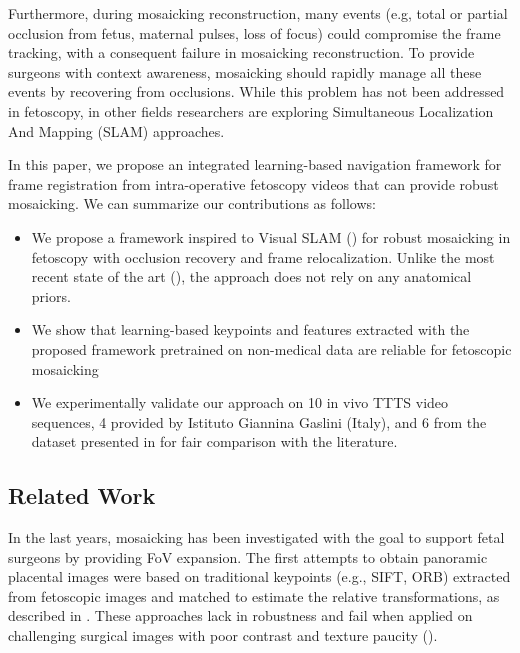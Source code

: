 \documentclass[sn-basic]{sn-jnl}%
\begin{document}
Furthermore, during mosaicking reconstruction, many events (e.g, total or partial occlusion from fetus, maternal pulses, loss of focus) could compromise the frame tracking, with a consequent failure in mosaicking reconstruction.
%
To provide surgeons with context awareness, mosaicking should rapidly manage all these events by recovering from occlusions. 
While this problem has not been addressed in fetoscopy, in other fields researchers are exploring Simultaneous Localization And Mapping (SLAM) approaches.




In this paper, we propose an integrated learning-based navigation framework for frame registration from intra-operative fetoscopy videos that can provide robust mosaicking. %
%
We can summarize our contributions as follows:
\begin{itemize}
    \item We propose a  framework inspired to Visual SLAM (\cite{taketomi2017visual})  for robust mosaicking in fetoscopy with occlusion recovery and frame relocalization. Unlike the most recent state of the art (\cite{BanoMosaicking2020}), the approach does not rely on any anatomical priors. %
    \item We show that learning-based keypoints and features extracted with the proposed framework pretrained on non-medical data are reliable for fetoscopic mosaicking
    \item We experimentally validate our approach on 10 in vivo TTTS video sequences, 4 provided by Istituto Giannina Gaslini (Italy), and 6 from the dataset presented in \cite{BanoMosaicking2020} for fair comparison with the literature.
\end{itemize}


\subsection{Related Work}
\label{sec:related}
In the last years, mosaicking has been investigated with the goal to support fetal surgeons by providing FoV expansion. 
The first attempts to obtain panoramic placental images were based on traditional keypoints (e.g., SIFT, ORB) extracted from fetoscopic images and matched to estimate the relative transformations, as described in \cite{Reeff2006, Yang2013, Daga2016, Sadda2019}. 
These approaches lack in robustness and fail when applied on challenging surgical images with poor contrast and texture paucity (\cite{BanoMosaicking2020}). 
\end{document}
